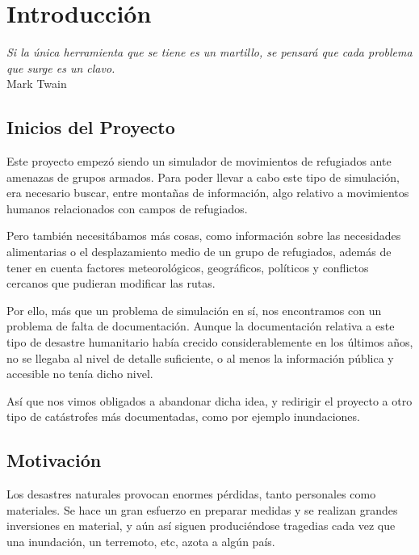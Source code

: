 \chapter*{Introducción} \label{cap0a}


\begin{flushright}
\begin{minipage}{7.85cm}
    {\em Si la única herramienta que se tiene es un martillo, se pensará que
    cada problema que surge es un clavo.} \\  Mark Twain
\end{minipage}
\end{flushright}

\vspace*{5mm}

\section*{Inicios del Proyecto}

Este proyecto empezó siendo un simulador de movimientos de refugiados ante
amenazas de grupos armados. Para poder llevar a cabo este tipo de simulación,
era necesario buscar, entre montañas de información, algo relativo a movimientos
humanos relacionados con campos de refugiados\cite{John08}.

Pero también necesitábamos más cosas, como información sobre las necesidades
alimentarias o el desplazamiento medio de un grupo de refugiados, además de
tener en cuenta factores meteorológicos, geográficos, políticos y conflictos
cercanos que pudieran modificar las rutas.

Por ello, más que un problema de simulación en sí, nos encontramos con un
problema de falta de documentación. Aunque la documentación relativa a este tipo
de desastre humanitario había crecido considerablemente en los últimos años,
no se llegaba al nivel de detalle suficiente, o al menos la información pública
y accesible no tenía dicho nivel.

Así que nos vimos obligados a abandonar dicha idea, y redirigir el proyecto a
otro tipo de catástrofes más documentadas, como por ejemplo inundaciones.

\section*{Motivación}

Los desastres naturales provocan enormes pérdidas, tanto personales como
materiales. Se hace un gran esfuerzo en preparar medidas y se realizan grandes
inversiones en material, y aún así siguen produciéndose tragedias cada vez que
una inundación, un terremoto, etc, azota a algún país\cite{Cho07}.

